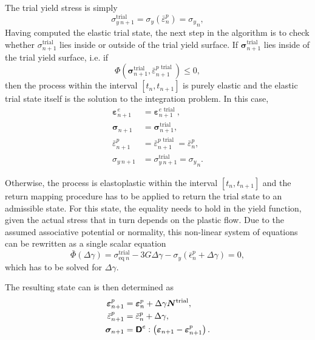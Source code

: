 The trial yield stress is simply
\begin{equation}
\sigma_{y\:n+1}^{\text {trial }}=\sigma_{y}\left(\bar{\varepsilon}_{n}^{p}\right)={\sigma_{y}}_n,
\end{equation}
Having computed the elastic trial state, the next step in the algorithm is to check whether \(\sigma_{n+1}^{\text {trial }}\) lies inside or outside of the trial yield surface.
If \(\bm \sigma_{n+1}^{\text {trial }}\) lies inside of the trial yield surface, i.e. if
\begin{equation}
\Phi\left(\bm \sigma_{n+1}^{\text {trial }},\bar{\varepsilon}_{n+1}^{p \text { trial }} \right) \leq 0,
\end{equation}
then the process within the interval \(\left[t_{n}, t_{n+1}\right]\) is purely elastic and the elastic trial state itself is the solution to the integration problem. In this case,
\begin{align}
\bm\varepsilon_{n+1}^{e}&=\bm\varepsilon_{n+1}^{e \text { trial }}, \\
\bm\sigma_{n+1}&=\bm\sigma_{n+1}^{\text {trial }}, \\
\bar{\varepsilon}_{n+1}^{p}&=\bar{\varepsilon}_{n+1}^{p \text { trial }}=\bar{\varepsilon}_{n}^{p}, \\
\sigma_{y\:n+1}&=\sigma_{y\:n+1}^{\text {trial }}={\sigma_{y}}_n.
\end{align}

Otherwise, the process is elastoplastic within the interval \(\left[t_{n}, t_{n+1}\right]\) and the return mapping procedure has to be applied to return the trial state to an admissible state.
For this state, the equality needs to hold in the yield function, given the actual stress that in turn depends on the plastic flow.
Due to the assumed associative potential or normality, this non-linear system of equations can be rewritten as a single scalar equation
\begin{equation}
\bar{\Phi}(\Delta \gamma)= \sigma_{\text{eq}\:n}^\text{trial}-3 G \Delta \gamma-\sigma_y(\bar{\epsilon}_n^p+\Delta \gamma)=0,
\end{equation}
which has to be solved for \(\Delta \gamma\).

The resulting state can is then determined as
\begin{align}
\bm\varepsilon^p_{n+1}&=\bm\varepsilon^p_n+\Delta \gamma \bm{N}^\text{trial}, \\
\bar{\varepsilon}^p_{n+1}&=\bar{\varepsilon}^p_n+\Delta \gamma,\\
\bm\sigma_{n+1}&=\boldsymbol{\mathsf{D}}^e:\left(\bm\varepsilon_{n+1}-\bm\varepsilon^p_ {n+1}\right).
\end{align}



